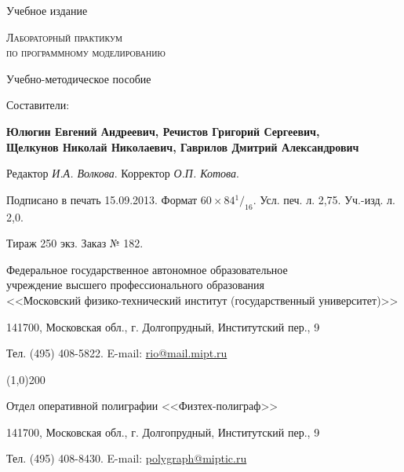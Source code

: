 \thispagestyle{empty}
\begingroup
\small
\parindent=0pt %

\begin{center}

\begin{normalsize}
\textsf{Учебное издание}
\end{normalsize}

\vfill

\begin{large}
\textsc{Лабораторный практикум \\
        \medskip
        по программному моделированию}
\end{large}

\vfill

\begin{normalsize}
Учебно-методическое пособие
\end{normalsize}

\vfill

\begin{small}
Составители:

\textbf{Юлюгин Евгений Андреевич, Речистов Григорий Сергеевич, \\
        Щелкунов Николай Николаевич, Гаврилов Дмитрий Александрович}
\end{small}

\end{center}

\vfill

\begin{flushleft}

\footnotesize

Редактор \textit{И.А. Волкова}. Корректор \textit{О.П. Котова}.

Подписано в печать 15.09.2013. Формат $60 \times 84 {^1}/_{16}$. Усл. печ. л. 2,75. Уч.-изд. л. 2,0.

Тираж 250 экз. Заказ № 182.

\medskip

Федеральное государственное автономное образовательное \\
учреждение высшего профессионального образования \\
<<Московский физико-тех\-ни\-чес\-кий институт (государственный университет)>>

141700, Московская обл., г. Долгопрудный, Институтский пер., 9

Тел. (495) 408-5822. E-mail: \url{rio@mail.mipt.ru}

\line(1,0){200}

Отдел оперативной полиграфии <<Физтех-полиграф>>

141700, Московская обл., г. Долгопрудный, Институтский пер., 9

Тел. (495) 408-8430. E-mail: \url{polygraph@miptic.ru}

\end{flushleft}
\endgroup
{}\label{page:lastpage}